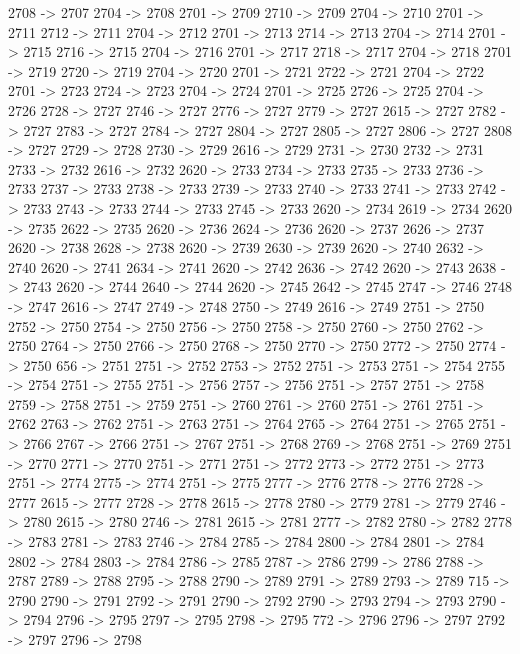 {	2708 -> 2707
	2704 -> 2708
	2701 -> 2709
	2710 -> 2709
	2704 -> 2710
	2701 -> 2711
	2712 -> 2711
	2704 -> 2712
	2701 -> 2713
	2714 -> 2713
	2704 -> 2714
	2701 -> 2715
	2716 -> 2715
	2704 -> 2716
	2701 -> 2717
	2718 -> 2717
	2704 -> 2718
	2701 -> 2719
	2720 -> 2719
	2704 -> 2720
	2701 -> 2721
	2722 -> 2721
	2704 -> 2722
	2701 -> 2723
	2724 -> 2723
	2704 -> 2724
	2701 -> 2725
	2726 -> 2725
	2704 -> 2726
	2728 -> 2727
	2746 -> 2727
	2776 -> 2727
	2779 -> 2727
	2615 -> 2727
	2782 -> 2727
	2783 -> 2727
	2784 -> 2727
	2804 -> 2727
	2805 -> 2727
	2806 -> 2727
	2808 -> 2727
	2729 -> 2728
	2730 -> 2729
	2616 -> 2729
	2731 -> 2730
	2732 -> 2731
	2733 -> 2732
	2616 -> 2732
	2620 -> 2733
	2734 -> 2733
	2735 -> 2733
	2736 -> 2733
	2737 -> 2733
	2738 -> 2733
	2739 -> 2733
	2740 -> 2733
	2741 -> 2733
	2742 -> 2733
	2743 -> 2733
	2744 -> 2733
	2745 -> 2733
	2620 -> 2734
	2619 -> 2734
	2620 -> 2735
	2622 -> 2735
	2620 -> 2736
	2624 -> 2736
	2620 -> 2737
	2626 -> 2737
	2620 -> 2738
	2628 -> 2738
	2620 -> 2739
	2630 -> 2739
	2620 -> 2740
	2632 -> 2740
	2620 -> 2741
	2634 -> 2741
	2620 -> 2742
	2636 -> 2742
	2620 -> 2743
	2638 -> 2743
	2620 -> 2744
	2640 -> 2744
	2620 -> 2745
	2642 -> 2745
	2747 -> 2746
	2748 -> 2747
	2616 -> 2747
	2749 -> 2748
	2750 -> 2749
	2616 -> 2749
	2751 -> 2750
	2752 -> 2750
	2754 -> 2750
	2756 -> 2750
	2758 -> 2750
	2760 -> 2750
	2762 -> 2750
	2764 -> 2750
	2766 -> 2750
	2768 -> 2750
	2770 -> 2750
	2772 -> 2750
	2774 -> 2750
	656 -> 2751
	2751 -> 2752
	2753 -> 2752
	2751 -> 2753
	2751 -> 2754
	2755 -> 2754
	2751 -> 2755
	2751 -> 2756
	2757 -> 2756
	2751 -> 2757
	2751 -> 2758
	2759 -> 2758
	2751 -> 2759
	2751 -> 2760
	2761 -> 2760
	2751 -> 2761
	2751 -> 2762
	2763 -> 2762
	2751 -> 2763
	2751 -> 2764
	2765 -> 2764
	2751 -> 2765
	2751 -> 2766
	2767 -> 2766
	2751 -> 2767
	2751 -> 2768
	2769 -> 2768
	2751 -> 2769
	2751 -> 2770
	2771 -> 2770
	2751 -> 2771
	2751 -> 2772
	2773 -> 2772
	2751 -> 2773
	2751 -> 2774
	2775 -> 2774
	2751 -> 2775
	2777 -> 2776
	2778 -> 2776
	2728 -> 2777
	2615 -> 2777
	2728 -> 2778
	2615 -> 2778
	2780 -> 2779
	2781 -> 2779
	2746 -> 2780
	2615 -> 2780
	2746 -> 2781
	2615 -> 2781
	2777 -> 2782
	2780 -> 2782
	2778 -> 2783
	2781 -> 2783
	2746 -> 2784
	2785 -> 2784
	2800 -> 2784
	2801 -> 2784
	2802 -> 2784
	2803 -> 2784
	2786 -> 2785
	2787 -> 2786
	2799 -> 2786
	2788 -> 2787
	2789 -> 2788
	2795 -> 2788
	2790 -> 2789
	2791 -> 2789
	2793 -> 2789
	715 -> 2790
	2790 -> 2791
	2792 -> 2791
	2790 -> 2792
	2790 -> 2793
	2794 -> 2793
	2790 -> 2794
	2796 -> 2795
	2797 -> 2795
	2798 -> 2795
	772 -> 2796
	2796 -> 2797
	2792 -> 2797
	2796 -> 2798
}
